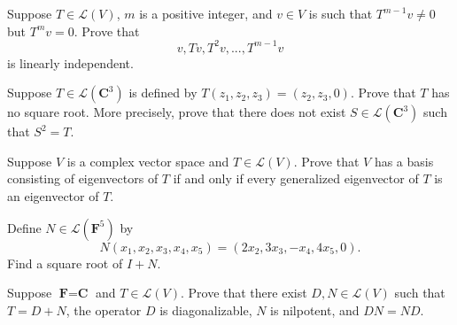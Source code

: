 \documentclass[12pt,letterpaper,boxed]{hmcpset}
\begin{document}

\begin{problem}[5]
Suppose $ T \in \mathcal{L}(V) $, $m$ is a positive integer, and $ v \in V $ is such that $ T^{m-1}v \neq 0 $ but $ T^mv = 0 $. Prove that
$$ v, Tv, T^2v,..., T^{m-1}v $$ is linearly independent. 
\end{problem}

\begin{solution}

\end{solution}

\clearpage

\begin{problem}[6]
Suppose $ T \in \mathcal{L}(\textbf{C}^3) $ is defined by $ T(z_1,z_2,z_3) = (z_2,z_3,0) $. Prove that $T$ has no square root. More precisely, prove that there does not exist $ S \in \mathcal{L}(\textbf{C}^3) $ such that $ S^2 = T $. 
\end{problem}

\begin{solution}
\end{solution}

\clearpage

\begin{problem}[5]
Suppose $V$ is a complex vector space and $ T \in \mathcal{L}(V) $. Prove that $V$ has a basis consisting of eigenvectors of $T$ if and only if every generalized eigenvector of $T$ is an eigenvector of $T$.
\newline
[$\textit{For} \ \textbf{F} = \textbf{C}$, $\textit{the exercise above adds an equivalence to the list in 5.41.}$]
\end{problem}

\begin{solution}
\end{solution}

\clearpage


\begin{problem}[6]
Define $ N \in \mathcal{L}(\textbf{F}^5) $ by
$$ N(x_1,x_2,x_3,x_4,x_5) = (2x_2,3x_3,-x_4, 4x_5,0). $$
Find a square root of $ I + N $. 
\end{problem}

\begin{solution}
\end{solution}

\clearpage

\begin{problem}[10]
Suppose $\textbf{F} = \textbf{C}$ and $ T \in \mathcal{L}(V) $. Prove that there exist $ D,N \in \mathcal{L}(V) $ such that $ T = D + N $, the operator $D$ is diagonalizable, $N$ is nilpotent, and $DN = ND$. 
\end{problem}

\begin{solution}

\end{solution}
\end{document}

